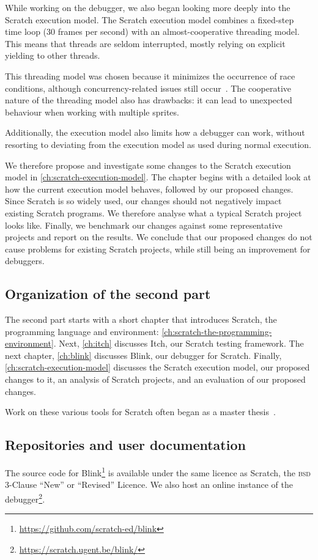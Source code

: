 \documentclass[../main]{subfiles}
\begin{document}
While working on the debugger, we also began looking more deeply into the Scratch execution model.
The Scratch execution model combines a fixed-step time loop (30 frames per second) with an almost-cooperative threading model.
This means that threads are seldom interrupted, mostly relying on explicit yielding to other threads.

This threading model was chosen because it minimizes the occurrence of race conditions, although concurrency-related issues still occur~\autocite{maloneyScratchProgrammingLanguage2010}.
The cooperative nature of the threading model also has drawbacks: it can lead to unexpected behaviour when working with multiple sprites.

Additionally, the execution model also limits how a debugger can work, without resorting to deviating from the execution model as used during normal execution.

We therefore propose and investigate some changes to the Scratch execution model in \cref{ch:scratch-execution-model}.
The chapter begins with a detailed look at how the current execution model behaves, followed by our proposed changes.
Since Scratch is so widely used, our changes should not negatively impact existing Scratch programs.
We therefore analyse what a typical Scratch project looks like.
Finally, we benchmark our changes against some representative projects and report on the results.
We conclude that our proposed changes do not cause problems for existing Scratch projects, while still being an improvement for debuggers.

\subsection{Organization of the second part}\label{subsec:organization-of-the-second-part}

The second part starts with a short chapter that introduces Scratch, the programming language and environment: \cref{ch:scratch-the-programming-environment}.
Next, \cref{ch:itch} discusses Itch, our Scratch testing framework.
The next chapter, \cref{ch:blink} discusses Blink, our debugger for Scratch.
Finally, \cref{ch:scratch-execution-model} discusses the Scratch execution model, our proposed changes to it, an analysis of Scratch projects, and an evaluation of our proposed changes.

Work on these various tools for Scratch often began as a master thesis~\autocite{makItchEenEducatief2019,voetenEenBlokgebaseerdTestframework2023,goethalsEenTimeTravelling2023,deproftBlinkEenEducatieve2022}.

\subsection{Repositories and user documentation}\label{subsec:repositories-and-code-scratch}

The source code for Blink\footnote{\url{https://github.com/scratch-ed/blink}} is available under the same licence as Scratch, the \textsc{bsd} 3-Clause ``New'' or ``Revised'' Licence.
We also host an online instance of the debugger\footnote{\url{https://scratch.ugent.be/blink/}}.
\end{document}
